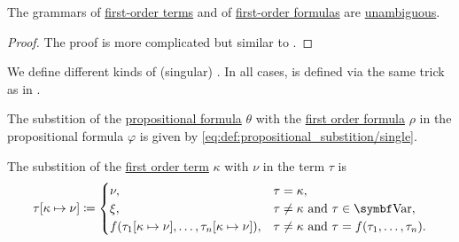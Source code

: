 \begin{proposition}\label{thm:propositional_formulas_are_unambiguous}
  The grammars of \hyperref[def:propositional_language/term]{first-order terms} and of \hyperref[def:propositional_language/formula]{first-order formulas} are \hyperref[def:grammar_derivation/ambiguity]{unambiguous}.
\end{proposition}
\begin{proof}
  The proof is more complicated but similar to .
\end{proof}

\begin{definition}\label{def:first_order_substition}
  We define different kinds of (singular) . In all cases,  is defined via the same trick as in .

  \begin{DefEnum}
     The substition of the \hyperref[def:propositional_language/formula]{propositional formula} \( \theta \) with the \hyperref[def:first_order_language/formula]{first order formula} \( \rho \) in the propositional formula \( \varphi \) is given by \eqref{eq:def:propositional_substition/single}.

     The substition of the \hyperref[def:first_order_language/term]{first order term} \( \kappa \) with \( \nu \) in the term \( \tau \) is
    \begin{equation}\label{eq:def:first_order_substition/term_in_term}
      \tau[\kappa \mapsto \nu] \coloneqq \begin{cases}
        \nu,                                                               &\tau = \kappa, \\
        \xi,                                                               &\tau \neq \kappa \T{and} \tau \in \Bold{Var}, \\
        f(\tau_1[\kappa \mapsto \nu], \ldots, \tau_n[\kappa \mapsto \nu]), &\tau \neq \kappa \T{and} \tau = f(\tau_1, \ldots, \tau_n).
      \end{cases}
    \end{equation}


\end{DefEnum}
\end{definition}
